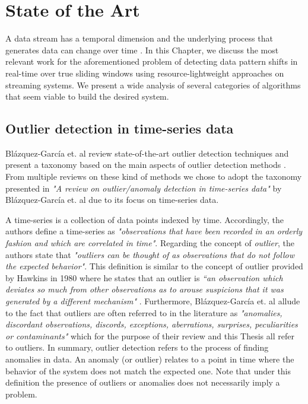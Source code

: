 \chapter{State of the Art} \label{chap:sota} \minitoc

A data stream has a temporal dimension and the underlying process that generates data can change over time \cite{Aggarwal-Evolving-Data-Streams} \cite{Domingos-Mining-Time-Data-Streams}. In this Chapter, we discuss the most relevant work for the aforementioned problem of detecting data pattern shifts in real-time over true sliding windows using resource-lightweight approaches on streaming systems. We present a wide analysis of several categories of algorithms that seem viable to build the desired system. 


\section{Outlier detection in time-series data}
Blázquez-García et. al review state-of-the-art outlier detection techniques and present a taxonomy based on the main aspects of outlier detection methods \cite{Blazquez-Garcia-Review-Anomaly-Detection}. From multiple reviews on these kind of methods \cite{Aggarwal-Outlier-survey} \cite{Aguinis-Outlier-survey} \cite{Chandola-Outlier-survey-2009} \cite{Hodge-Outlier-survey} \cite{Xu-outlier-survey-2019} we chose to adopt the taxonomy presented in \textit{"A review on outlier/anomaly detection in time-series data"} by Blázquez-García et. al due to its focus on time-series data.

A time-series is a collection of data points indexed by time. Accordingly, the authors define a time-series as \textit{"observations that have been recorded in an orderly fashion and which are correlated in time"}. Regarding the concept of \textit{outlier}, the authors state that \textit{"outliers can be thought of as observations that do not follow the expected behavior"}. This definition is similar to the concept of outlier provided by Hawkins in 1980 where he states that an outlier is \textit{“an observation which deviates so much from other observations as to arouse suspicions that it was
generated by a different mechanism"} \cite{Hawkins-Outliers}. Furthermore, Blázquez-García et. al allude to the fact that outliers are often referred to in the literature as \textit{"anomalies, discordant observations, discords, exceptions, aberrations, surprises, peculiarities or contaminants"} which for the purpose of their review and this Thesis all refer to outliers. In summary, outlier detection refers to the process of finding anomalies in data. An anomaly (or outlier) relates to a point in time where the behavior of the system does not match the expected one. Note that under this definition the presence of outliers or anomalies does not necessarily imply a problem. 

